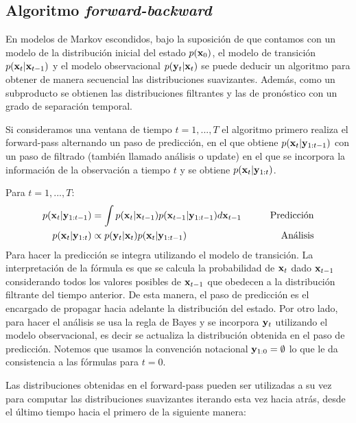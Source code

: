 \subsection{Algoritmo \textit{forward-backward}}

En modelos de Markov escondidos, bajo la suposición de que contamos con un modelo de la distribución inicial del estado $p(\mathbf{x}_0)$, el modelo de transición $p(\mathbf{x}_t | \mathbf{x}_{t-1})$ y el modelo observacional $p(\mathbf{y}_t | \mathbf{x}_t)$ se puede deducir un algoritmo para obtener de manera secuencial las distribuciones suavizantes. Además, como un subproducto se obtienen las distribuciones filtrantes y las de pronóstico con un grado de separación temporal. 

Si consideramos una ventana de tiempo $t = 1, ..., T$ el algoritmo primero realiza el forward-pass alternando un paso de predicción, en el que obtiene $p(\mathbf{x}_t | \mathbf{y}_{1:t-1})$ con un paso de filtrado (también llamado análisis o update) en el que se incorpora la información de la observación a tiempo $t$ y se obtiene $p(\mathbf{x}_t | \mathbf{y}_{1:t})$. 

Para $t = 1, ..., T$:
\begin{align}
    p(\mathbf{x}_t | \mathbf{y}_{1:t-1}) &= \int p(\mathbf{x}_t | \mathbf{x}_{t-1}) p(\mathbf{x}_{t-1} | \mathbf{y}_{1:t-1}) d\mathbf{x}_{t-1} \hspace{2em} &\text{Predicción} \label{eq:forward_pred} \\
    p(\mathbf{x}_t | \mathbf{y}_{1:t}) &\propto p(\mathbf{y}_t | \mathbf{x}_t) p(\mathbf{x}_t | \mathbf{y}_{1:t-1}) \hspace{2em} &\text{Análisis} \label{eq:forward_filt}
\end{align}
Para hacer la predicción se integra utilizando el modelo de transición. La interpretación de la fórmula es que se calcula la probabilidad de $\mathbf{x}_t$ dado $\mathbf{x}_{t-1}$ considerando todos los valores posibles de $\mathbf{x}_{t-1}$ que obedecen a la distribución filtrante del tiempo anterior. De esta manera, el paso de predicción es el encargado de propagar hacia adelante la distribución del estado. Por otro lado, para hacer el análisis se usa la regla de Bayes y se incorpora $\mathbf{y}_t$ utilizando el modelo observacional, es decir se actualiza la distribución obtenida en el paso de predicción. Notemos que usamos la convención notacional $\mathbf{y}_{1:0} = \emptyset$ lo que le da consistencia a las fórmulas para $t = 0$.

Las distribuciones obtenidas en el forward-pass pueden ser utilizadas a su vez para computar las distribuciones suavizantes iterando esta vez hacia atrás, desde el último tiempo hacia el primero de la siguiente manera:

